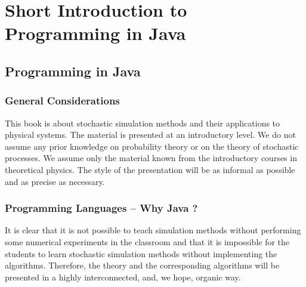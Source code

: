 
\chapter{Short Introduction to Programming in Java}
\label{chap:IntroJava}

\section{Programming in Java}
\label{sec:Programming}


\subsection{General Considerations}
\label{sec:General_considerations}
This book is about stochastic simulation methods and their applications to
physical systems. The material is presented at an introductory level. We do 
not assume any prior knowledge on probability theory or on the theory of 
stochastic processes. We assume only the material known from the introductory 
courses in theoretical physics. The style of the presentation will be as 
informal as possible and as precise as necessary.



\subsection{Programming Languages -- Why Java ?}
\label{sec:Programming_languages}
It is clear that it is not possible to teach simulation methods without 
performing some numerical experiments in the classroom and that it is 
impossible for the students to learn stochastic simulation methods without 
implementing the algorithms. Therefore, the theory and the corresponding 
algorithms will be presented in a highly interconnected, and, we 
hope, organic way.

